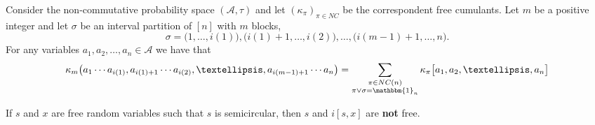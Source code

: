 \documentclass[10pt,a4paper]{amsart}
\begin{document}
\begin{thm}\label{thm:product-entries}
Consider the non-commutative probability space $(\mathcal{A}, \tau)$ and let
$(\kappa_\pi)_{\pi \in NC} $ be the correspondent free cumulants. Let $m $ be a positive integer and let $\sigma $ be an interval partition of $[n]$ with $m$ blocks, 
\[ \sigma = \big(1, \dots, i(1)\big), \big(i(1)+1, \dots, i(2)\big), 
\dots, 
\big(i(m-1)+1, \dots, n\big).
\]
For any variables $ a_1, a_2, \dots, a_n \in \mathcal{A}$  we have that
\[ 
\kappa_m \big( a_1\cdots a_{i(1)}, a_{i(1)+1} \cdots a_{i(2)}, \dots, a_{i(m-1)+1} \cdots a_n \big)
= 
\sum_{\substack{\pi\in NC(n)\\ \pi \vee \sigma = \mathbbm{1}_n}}
\kappa_{\pi}\big[a_1,a_2, \dots, a_n\big]
\]

\end{thm}

\begin{lemma}\label{lem:31}
 If $ s $ and $ x $ are free random variables such that $s $ is semicircular, then $ s $ and $ i[s, x] $ are \textbf{not} free.
\end{lemma}
\end{document}
